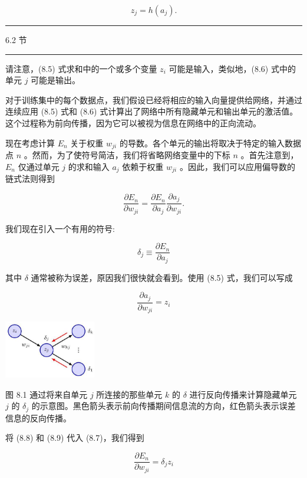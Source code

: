 \documentclass[10pt]{report}
\newcommand{\HRule}{\begin{center}\rule{0.9\linewidth}{0.2mm}\end{center}}
\begin{document}
\[
{z}_{j} = h\left( {a}_{j}\right) . \tag{8.6}
\]

\HRule

6.2 节

\HRule

请注意，(8.5) 式求和中的一个或多个变量 \({z}_{i}\) 可能是输入，类似地，(8.6) 式中的单元 \(j\) 可能是输出。

对于训练集中的每个数据点，我们假设已经将相应的输入向量提供给网络，并通过连续应用 (8.5) 式和 (8.6) 式计算出了网络中所有隐藏单元和输出单元的激活值。这个过程称为前向传播，因为它可以被视为信息在网络中的正向流动。

现在考虑计算 \({E}_{n}\) 关于权重 \({w}_{ji}\) 的导数。各个单元的输出将取决于特定的输入数据点 \(n\) 。然而，为了使符号简洁，我们将省略网络变量中的下标 \(n\) 。首先注意到， \({E}_{n}\) 仅通过单元 \(j\) 的求和输入 \({a}_{j}\) 依赖于权重 \({w}_{ji}\) 。因此，我们可以应用偏导数的链式法则得到

\[
\frac{\partial {E}_{n}}{\partial {w}_{ji}} = \frac{\partial {E}_{n}}{\partial {a}_{j}}\frac{\partial {a}_{j}}{\partial {w}_{ji}}. \tag{8.7}
\]

我们现在引入一个有用的符号:

\[
{\delta }_{j} \equiv  \frac{\partial {E}_{n}}{\partial {a}_{j}} \tag{8.8}
\]

其中 \(\delta\) 通常被称为误差，原因我们很快就会看到。使用 (8.5) 式，我们可以写成

\[
\frac{\partial {a}_{j}}{\partial {w}_{ji}} = {z}_{i} \tag{8.9}
\]

\begin{center}
\includegraphics[max width=0.3\textwidth]{images/0194e279-9b28-703a-88f4-c3ac21e2010d_255_1108_344_433_272_0.jpg}
\end{center}
\hspace*{3em} 

图 8.1 通过将来自单元 \(j\) 所连接的那些单元 \(k\) 的 \(\delta\) 进行反向传播来计算隐藏单元 \(j\) 的 \({\delta }_{j}\) 的示意图。黑色箭头表示前向传播期间信息流的方向，红色箭头表示误差信息的反向传播。

将 (8.8) 和 (8.9) 代入 (8.7)，我们得到

\[
\frac{\partial {E}_{n}}{\partial {w}_{ji}} = {\delta }_{j}{z}_{i} \tag{8.10}
\]
\end{document}
